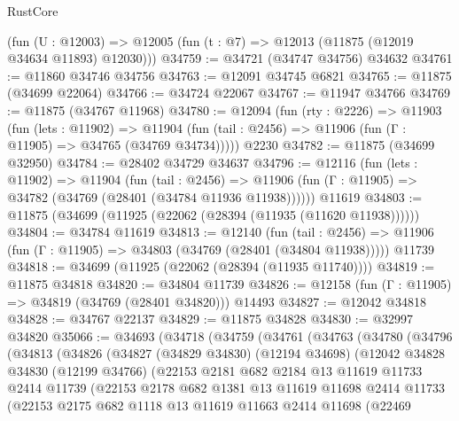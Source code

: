\begin{lexlean}{RustCore}
\begin{coremodule}
    (fun (U : @12003) => @12005 (fun (t : @7) => @12013 (@11875 (@12019 @34634 @11893) @12030)))
@34759 := @34721 (@34747 @34756) @34632
@34761 := @11860 @34746 @34756
@34763 := @12091 @34745 @6821
@34765 := @11875 (@34699 @22064)
@34766 := @34724 @22067
@34767 := @11947 @34766
@34769 := @11875 (@34767 @11968)
@34780 := @12094
    (fun (rty : @2226) =>
    @11903
      (fun (lets : @11902) =>
      @11904 (fun (tail : @2456) => @11906 (fun (Γ : @11905) => @34765 (@34769 @34734)))))
    @2230
@34782 := @11875 (@34699 @32950)
@34784 := @28402 @34729 @34637
@34796 := @12116
    (fun (lets : @11902) =>
    @11904
      (fun (tail : @2456) =>
      @11906 (fun (Γ : @11905) => @34782 (@34769 (@28401 (@34784 @11936 @11938))))))
    @11619
@34803 := @11875 (@34699 (@11925 (@22062 (@28394 (@11935 (@11620 @11938))))))
@34804 := @34784 @11619
@34813 := @12140
    (fun (tail : @2456) => @11906 (fun (Γ : @11905) => @34803 (@34769 (@28401 (@34804 @11938)))))
    @11739
@34818 := @34699 (@11925 (@22062 (@28394 (@11935 @11740))))
@34819 := @11875 @34818
@34820 := @34804 @11739
@34826 := @12158 (fun (Γ : @11905) => @34819 (@34769 (@28401 @34820))) @14493
@34827 := @12042 @34818
@34828 := @34767 @22137
@34829 := @11875 @34828
@34830 := @32997 @34820
@35066 := @34693
    (@34718
      (@34759
        (@34761
          (@34763
            (@34780
              (@34796
                (@34813
                  (@34826
                    (@34827
                      (@34829 @34830)
                      (@12194 @34698)
                      (@12042
                        @34828
                        @34830
                        (@12199 @34766)
                        (@22153
                          @2181
                          @682
                          @2184
                          @13
                          @11619
                          @11733
                          @2414
                          @11739
                          (@22153
                            @2178
                            @682
                            @1381
                            @13
                            @11619
                            @11698
                            @2414
                            @11733
                            (@22153
                              @2175
                              @682
                              @1118
                              @13
                              @11619
                              @11663
                              @2414
                              @11698
                              (@22469

\end{coremodule}
\end{lexlean}
